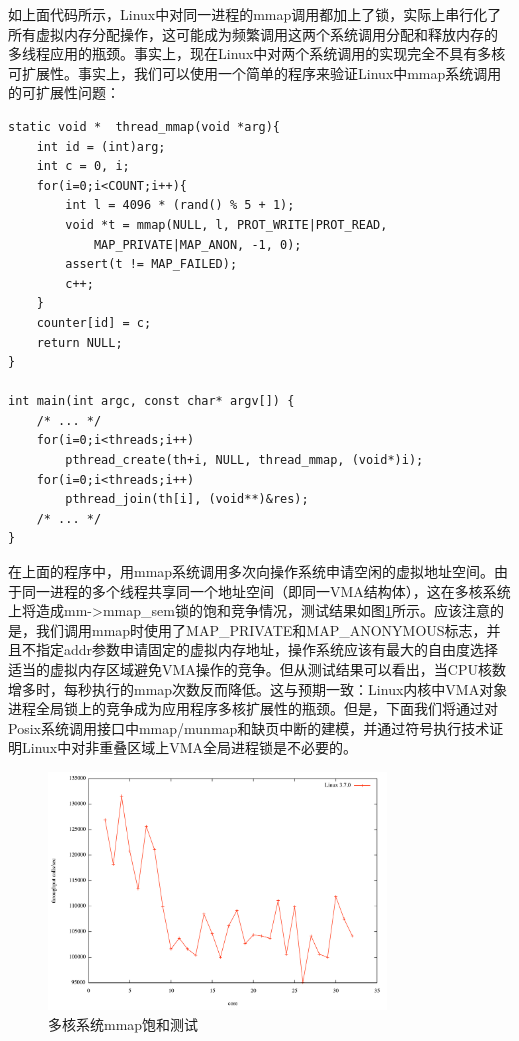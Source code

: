 如上面代码所示，Linux中对同一进程的mmap调用都加上了锁，实际上串行化了所有虚拟内存分配操作，这可能成为频繁调用这两个系统调用分配和释放内存的
多线程应用的瓶颈。事实上，现在Linux中对两个系统调用的实现完全不具有多核可扩展性。事实上，我们可以使用一个简单的程序来验证Linux中mmap系统调用的可扩展性问题：

\begin{lstlisting}
static void *  thread_mmap(void *arg){
	int id = (int)arg;
	int c = 0, i;
	for(i=0;i<COUNT;i++){
		int l = 4096 * (rand() % 5 + 1);
		void *t = mmap(NULL, l, PROT_WRITE|PROT_READ,
			MAP_PRIVATE|MAP_ANON, -1, 0);
		assert(t != MAP_FAILED);
		c++;
	}
	counter[id] = c;
	return NULL;
}

int main(int argc, const char* argv[]) {
	/* ... */
	for(i=0;i<threads;i++)
		pthread_create(th+i, NULL, thread_mmap, (void*)i);
	for(i=0;i<threads;i++)
		pthread_join(th[i], (void**)&res);
	/* ... */
}
\end{lstlisting}

在上面的程序中，用mmap系统调用多次向操作系统申请空闲的虚拟地址空间。由于同一进程的多个线程共享同一个地址空间（即同一VMA结构体），这在多核系统上将造成mm->mmap\_sem锁的饱和竞争情况，测试结果如图\ref{fig:mmap_test}所示。应该注意的是，我们调用mmap时使用了MAP\_PRIVATE和MAP\_ANONYMOUS标志，并且不指定addr参数申请固定的虚拟内存地址，操作系统应该有最大的自由度选择适当的虚拟内存区域避免VMA操作的竞争。但从测试结果可以看出，当CPU核数增多时，每秒执行的mmap次数反而降低。这与预期一致：Linux内核中VMA对象进程全局锁上的竞争成为应用程序多核扩展性的瓶颈。但是，下面我们将通过对Posix系统调用接口中mmap/munmap和缺页中断的建模，并通过符号执行技术证明Linux中对非重叠区域上VMA全局进程锁是不必要的。

\begin{figure}[ht]
\begin{center}
\includegraphics[width=0.8\textwidth]{figures/mmap_test.pdf}
\end{center}
\caption{多核系统mmap饱和测试}
\label{fig:mmap_test}
\end{figure}

